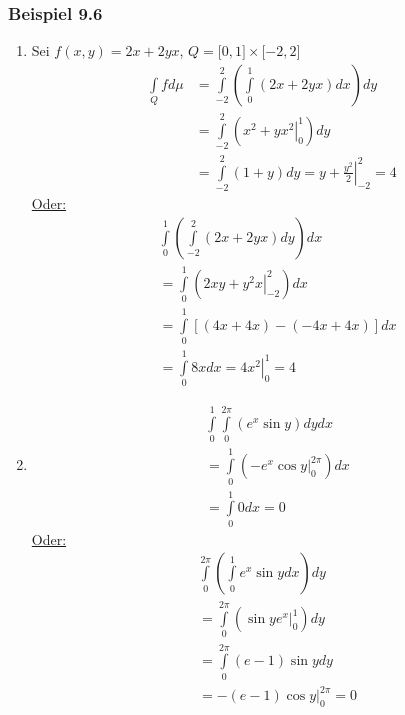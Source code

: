 \subsubsection*{Beispiel 9.6}
\begin{enumerate}
\item Sei $f\left( x,y\right)=2x+2yx$, $Q=\lbrack 0,1\rbrack\times\lbrack -2,2\rbrack$
\begin{align*}
\int\limits_Q {fd\mu }  &=\int\limits_{ - 2}^2 {\left( {\int\limits_0^1 {\left( {2x + 2yx} \right)dx} } \right)dy} \\
&=\int\limits_{ - 2}^2 {\left( {\left. {{x^2} + y{x^2}} \right|_0^1} \right)dy} \\
&=\int\limits_{ - 2}^2 {\left( {1 + y} \right)dy}  = \left. {y + \frac{{{y^2}}}{2}} \right|_{ - 2}^2 = 4
\end{align*}
\underline{Oder:}
\begin{align*}
&\int\limits_0^1 {\left( {\int\limits_{ - 2}^2 {\left( {2x + 2yx} \right)dy} } \right)dx} \\
 &=\int\limits_0^1 {\left( {\left. {2xy + {y^2}x} \right|_{ - 2}^2} \right)dx} \\
 &=\int\limits_0^1 {\left[ {\left( {4x + 4x} \right) - \left( { - 4x + 4x} \right)} \right]dx} \\
 &=\int\limits_0^1 {8xdx}  = \left. {4{x^2}} \right|_0^1 = 4
\end{align*}
\item \begin{align*}
&\int\limits_0^1 {\int\limits_0^{2\pi } {\left( {{e^x}\sin y} \right)dy} dx} \\
&=\int\limits_0^1 {\left( {\left. { - {e^x}\cos y} \right|_0^{2\pi }} \right)dx} \\
&=\int\limits_0^1 0 dx = 0
\end{align*}
\underline{Oder:}
\begin{align*}
&\int\limits_0^{2\pi } {\left( {\int\limits_0^1 {{e^x}\sin ydx} } \right)dy} \\
&=\int\limits_0^{2\pi } {\left( {\left. {\sin y{e^x}} \right|_0^1} \right)dy} \\
&=\int\limits_0^{2\pi } {\left( {e - 1} \right)\sin ydy} \\
&=\left. { - \left( {e - 1} \right)\cos y} \right|_0^{2\pi } = 0
\end{align*}
\end{enumerate}

